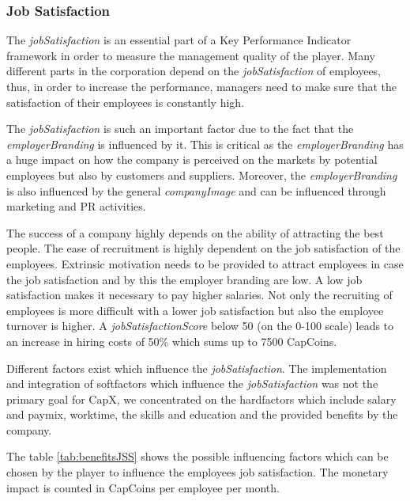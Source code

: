 \subsubsection{Job Satisfaction}
\label{subsub:jss}
The \textit{jobSatisfaction} is an essential part of a Key Performance Indicator framework in order to measure the management quality of the player. Many different parts in the corporation depend on the \textit{jobSatisfaction} of employees, thus, in order to increase the performance, managers need to make sure that the satisfaction of their employees is constantly high. \cite{KOYS}

The \textit{jobSatisfaction} is such an important factor due to the fact that the \textit{employerBranding} is influenced by it. This is critical as the \textit{employerBranding} has a huge impact on how the company is perceived on the markets by potential employees but also by customers and suppliers. Moreover, the \textit{employerBranding} is also influenced by the general \textit{companyImage} and can be influenced through marketing and PR activities. 

The success of a company highly depends on the ability of attracting the best people. The ease of recruitment is highly dependent on the job satisfaction of the employees. Extrinsic motivation needs to be provided to attract employees in case the job satisfaction and by this the employer branding are low. A low job satisfaction makes it necessary to pay higher salaries. Not only the recruiting of employees is more difficult with a lower job satisfaction but also the employee turnover is higher. A \textit{jobSatisfactionScore} below 50 (on the 0-100 scale) leads to an increase in hiring costs of 50\% which sums up to 7500 CapCoins. \cite{frederiksen2016}

Different factors exist which influence the \textit{jobSatisfaction}. \cite{Kapur} The implementation and integration of softfactors which influence the \textit{jobSatisfaction} was not the primary goal for CapX, we concentrated on the hardfactors which include salary and paymix, worktime, the skills and education and the provided benefits by the company. 

The table \ref{tab:benefitsJSS} shows the possible influencing factors which can be chosen by the player to influence the employees job satisfaction. The monetary impact is counted in CapCoins per employee per month. 

